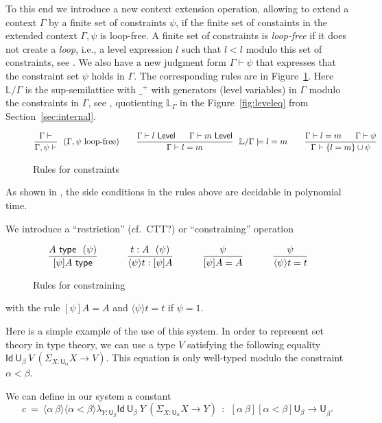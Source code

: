 \documentclass[11pt,a4paper]{article}
\theoremstyle{definition}
\newcommand{\lam}[1]{{\langle}#1{\rangle}}
\newcommand{\Id}{\mathsf{Id}}
\newcommand{\UU}{\mathsf{U}}
\newcommand{\Level}{\mathsf{Level}}
\newcommand{\Lev}{{\mathbb{L}}}
\newcommand{\type}{\mathsf{type}}
\newcommand{\set}[1]{\{#1\}}
\begin{document}
To this end we introduce a new context extension operation,
allowing to extend a context $\Gamma$ by a finite set of
constraints $\psi$, if the finite set of constaints in the
extended context $\Gamma,\psi$ is loop-free. 
A finite set of constraints is {\em loop-free} if it does not 
create a {\em loop}, i.e., a level expression $l$ such that $l<l$ 
modulo this set of constraints, see \cite{bezem-coquand:lattices}.
We also have a new judgment form $\Gamma\vdash\psi$ that expresses 
that the constraint set $\psi$ holds in $\Gamma$.
The corresponding rules are in Figure~\ref{fig:constraints}. 
Here $\Lev/\Gamma$ is the sup-semilattice with $\_^+$ with generators 
(level variables) in $\Gamma$ modulo the constraints in $\Gamma$, 
see \cite{bezem-coquand:lattices}, quotienting $\Lev_\Gamma$ in
the Figure~\ref{fig:leveleq} from Section~\ref{sec:internal}.

\begin{figure}[H]
  \caption{Rules for constraints}\label{fig:constraints}
$$
\frac{\Gamma\vdash}{\Gamma,\psi\vdash}~~(\Gamma,\psi~\text{loop-free})~~~~~~
\frac{\Gamma\vdash l~\Level~~~~~\Gamma\vdash m~\Level}
     {\Gamma\vdash l=m}~~\Lev/\Gamma \models l=m~~~~~~
\frac{\Gamma\vdash l=m~~~~~\Gamma\vdash \psi}{\Gamma\vdash\set{l=m}\cup\psi}
\belowdisplayshortskip 0pt
$$
\end{figure}

As shown in \cite{bezem-coquand:lattices}, the side conditions
in the rules above are decidable in polynomial time.

We introduce a ``restriction'' (cf.\ CTT?) or ``constraining'' operation
\begin{figure}[H]
  \caption{Rules for constraining}%
  \label{fig:restriction}
$$
\frac{A~\type~~(\psi)}{[\psi]A~\type}~~~~~~~~~
\frac{{t}:A~~(\psi)}{\lam{\psi}{t}:[\psi]A}~~~~~~~~~
\frac{\psi}{[\psi]A = A}~~~~~~~~~
\frac{\psi}{\lam{\psi}{t} = t}
\belowdisplayshortskip 1pt
$$
\end{figure}
with the rule $[\psi]A = A$ and $\lam{\psi}{t} = t$ if $\psi = 1$.


Here is a simple example of the use of this system. 
In order to represent set theory in type
theory, we can use a type $V$ satisfying the following equality $\Id~{\UU_{\beta}}~V~(\Sigma_{X:\UU_{\alpha}}X\rightarrow V)$.
This equation is only well-typed modulo the constraint $\alpha<\beta$.

We can define in our system a constant
$$
c~=~\lam{\alpha~\beta}\lam{\alpha<\beta}\lambda_{Y:\UU_{\beta}}\Id~{\UU_{\beta}}~Y~ (\Sigma_{X:\UU_{\alpha}}X\rightarrow Y)~~:~~
   [\alpha~\beta][\alpha<\beta]\UU_{\beta} \rightarrow \UU_{\beta^+}
$$
\end{document}
